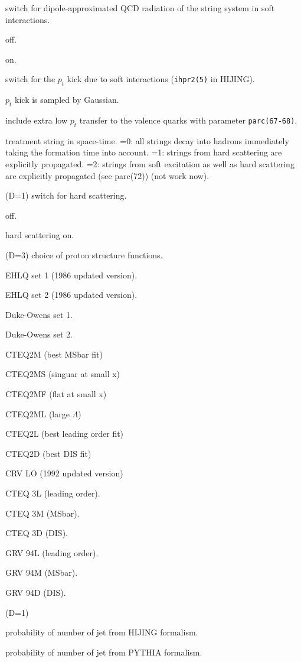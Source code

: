 \documentclass[]{article}
\newenvironment{entry}%
{\begin{list}{}{\setlength{\topsep}{0mm} \setlength{\itemsep}{0mm}
\setlength{\parskip}{0mm} \setlength{\parsep}{0mm}
\setlength{\leftmargin}{20mm} \setlength{\rightmargin}{0mm}
\setlength{\labelwidth}{18mm} \setlength{\labelsep}{2mm}}}%
{\end{list}}
\newenvironment{subentry}%
{\begin{list}{}{\setlength{\topsep}{0mm} \setlength{\itemsep}{0mm}
\setlength{\parskip}{0mm} \setlength{\parsep}{0mm}
\setlength{\leftmargin}{10mm} \setlength{\rightmargin}{0mm}
\setlength{\labelwidth}{18mm} \setlength{\labelsep}{2mm}}}%
{\end{list}}
\newcommand{\ttt}[1]{{\tt#1}}
\newcommand{\itemt}[1]{\item[{\tt #1}\hfill]}
\begin{document}
\begin{entry}
\itemt{mstc(74)(D=1) :} switch for dipole-approximated QCD radiation
                    of the string system in soft interactions.

 \begin{subentry}
   \itemt{$=0$ :} off.
   \itemt{$=1$ :} on.
 \end{subentry}

\itemt{mstc(75)(D=1) :} switch for the $p_t$ kick due to soft interactions
                 (\ttt{ihpr2(5)} in HIJING).
 \begin{subentry}
   \itemt{$=0$ :} $p_t$ kick is sampled by Gaussian.
   \itemt{$=1$ :} include extra low $p_t$ transfer to the valence quarks
       with parameter \ttt{parc(67-68)}.
 \end{subentry}

\itemt{mstc(76) (D=0) :} treatment string in space-time.
    =0: all strings decay into hadrons immediately taking
       the formation time into account. 
    =1: strings from hard scattering
       are explicitly propagated.
    =2: strings from soft excitation as well as hard scattering
       are explicitly propagated (see parc(72)) (not work now).


\medskip

\itemt{mstc(81) :} (D=1)  switch for hard scattering.
 \begin{subentry}
    \itemt{$=0$ :} off.
    \itemt{$=1$ :} hard scattering on.
 \end{subentry}

\itemt{mstc(82) :}(D=3) choice of proton structure functions.
 \begin{subentry}
    \itemt{$=1$ :} EHLQ set 1 (1986 updated version).
    \itemt{$=2$ :} EHLQ set 2 (1986 updated version).
    \itemt{$=3$ :} Duke-Owens set 1.
    \itemt{$=4$ :} Duke-Owens set 2.
    \itemt{$=5$ :} CTEQ2M (best MSbar fit)
    \itemt{$=6$ :} CTEQ2MS (singuar at small x)
    \itemt{$=7$ :} CTEQ2MF (flat at small x)
    \itemt{$=8$ :} CTEQ2ML (large $\Lambda$)
    \itemt{$=9$ :} CTEQ2L (best leading order fit)
    \itemt{$=10$ :} CTEQ2D (best DIS fit)
    \itemt{$=11$ :} CRV LO (1992 updated version)
    \itemt{$=12$ :} CTEQ 3L (leading order). 
    \itemt{$=13$ :} CTEQ 3M (MSbar).
    \itemt{$=14$ :} CTEQ 3D (DIS).
    \itemt{$=15$ :} GRV 94L (leading order).  %
    \itemt{$=16$ :} GRV 94M (MSbar).
    \itemt{$=17$ :} GRV 94D (DIS).
 \end{subentry}

\itemt{mstc(83) :}(D=1) 
 \begin{subentry}
     \itemt{$=1$ :} probability of number of jet from HIJING formalism.
     \itemt{$=2$ :} probability of number of jet from PYTHIA formalism.
 \end{subentry}


\end{entry}
\end{document}
